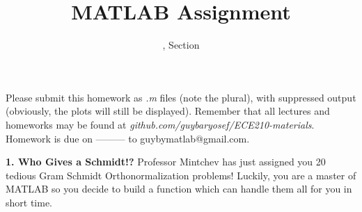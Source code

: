 \documentclass[11pt]{article}
\title{MATLAB Assignment \Homework}
\author{\Session, Section \Section}
\date{}
\makeatletter
\def\MyEmail{guybymatlab@gmail.com}
\def\DateOfSubmission{ --------- }
\makeatother
\begin{document}
\maketitle
Please submit this homework as \textit{.m} files (note the plural), 
with suppressed output (obviously, the plots will still be displayed).
Remember that all lectures and homeworks may be found at 
\textit{github.com/guybaryosef/ECE210-materials}.
Homework is due on \DateOfSubmission to \MyEmail.

\noindent
\newline
\textbf{1. Who Gives a Schmidt!?}
Professor Mintchev has just assigned you 20 tedious Gram Schmidt Orthonormalization problems!
Luckily, you are a master of MATLAB so you decide to build a function which can handle them all
for you in short time.
\end{document}
